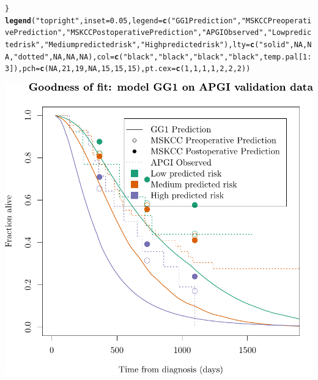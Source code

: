 \documentclass{article}\usepackage[]{graphicx}\usepackage[]{color}
\makeatletter
\def\maxwidth{ %
  \ifdim\Gin@nat@width>\linewidth
    \linewidth
  \else
    \Gin@nat@width
  \fi
}
\newcommand{\hlnum}[1]{\textcolor[rgb]{0.686,0.059,0.569}{#1}}%
\newcommand{\hlstr}[1]{\textcolor[rgb]{0.192,0.494,0.8}{#1}}%
\newcommand{\hlopt}[1]{\textcolor[rgb]{0,0,0}{#1}}%
\newcommand{\hlstd}[1]{\textcolor[rgb]{0.345,0.345,0.345}{#1}}%
\newcommand{\hlkwc}[1]{\textcolor[rgb]{0.333,0.667,0.333}{#1}}%
\newcommand{\hlkwd}[1]{\textcolor[rgb]{0.737,0.353,0.396}{\textbf{#1}}}%
\newenvironment{kframe}{%
 \def\at@end@of@kframe{}%
 \ifinner\ifhmode%
  \def\at@end@of@kframe{\end{minipage}}%
  \begin{minipage}{\columnwidth}%
 \fi\fi%
 \def\FrameCommand##1{\hskip\@totalleftmargin \hskip-\fboxsep
 \colorbox{shadecolor}{##1}\hskip-\fboxsep
     \hskip-\linewidth \hskip-\@totalleftmargin \hskip\columnwidth}%
 \MakeFramed {\advance\hsize-\width
   \@totalleftmargin\z@ \linewidth\hsize
   \@setminipage}}%
 {\par\unskip\endMakeFramed%
 \at@end@of@kframe}
\newenvironment{knitrout}{}{} %
\makeatother
\begin{document}
\begin{knitrout}
\begin{kframe}
\begin{alltt}
\hlstd{\}}
\hlkwd{legend}\hlstd{(}\hlstr{"topright"}\hlstd{,} \hlkwc{inset} \hlstd{=} \hlnum{0.05}\hlstd{,} \hlkwc{legend} \hlstd{=} \hlkwd{c}\hlstd{(}\hlstr{"GG1 Prediction"}\hlstd{,} \hlstr{"MSKCC Preoperative Prediction"}\hlstd{,} \hlstr{"MSKCC Postoperative Prediction"}\hlstd{,} \hlstr{"APGI Observed"}\hlstd{,} \hlstr{"Low predicted risk"}\hlstd{,} \hlstr{"Medium predicted risk"}\hlstd{,} \hlstr{"High predicted risk"}\hlstd{),} \hlkwc{lty} \hlstd{=} \hlkwd{c}\hlstd{(}\hlstr{"solid"}\hlstd{,} \hlnum{NA}\hlstd{,} \hlnum{NA}\hlstd{,} \hlstr{"dotted"}\hlstd{,} \hlnum{NA}\hlstd{,} \hlnum{NA}\hlstd{,} \hlnum{NA}\hlstd{),} \hlkwc{col} \hlstd{=} \hlkwd{c}\hlstd{(}\hlstr{"black"}\hlstd{,} \hlstr{"black"}\hlstd{,} \hlstr{"black"}\hlstd{,} \hlstr{"black"}\hlstd{, temp.pal[}\hlnum{1}\hlopt{:}\hlnum{3}\hlstd{]),} \hlkwc{pch} \hlstd{=} \hlkwd{c}\hlstd{(}\hlnum{NA}\hlstd{,} \hlnum{21}\hlstd{,} \hlnum{19}\hlstd{,} \hlnum{NA}\hlstd{,} \hlnum{15}\hlstd{,} \hlnum{15}\hlstd{,} \hlnum{15}\hlstd{),} \hlkwc{pt.cex} \hlstd{=} \hlkwd{c}\hlstd{(}\hlnum{1}\hlstd{,} \hlnum{1}\hlstd{,} \hlnum{1}\hlstd{,} \hlnum{1}\hlstd{,} \hlnum{2}\hlstd{,} \hlnum{2}\hlstd{,} \hlnum{2}\hlstd{))}
\end{alltt}
\end{kframe}

{\centering \includegraphics[width=\maxwidth]{figure/07-altman-4-apgi-1} 

}



\end{knitrout}
\end{document}
